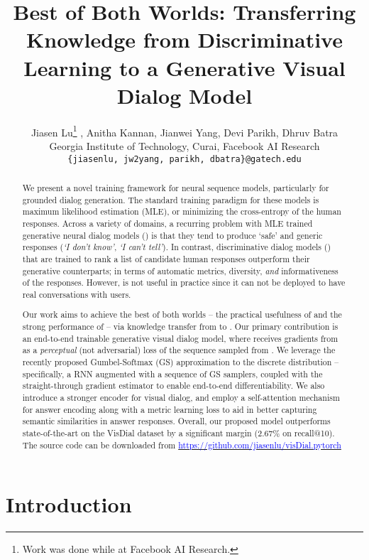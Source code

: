\documentclass{article}
\title{Best of Both Worlds: Transferring Knowledge from Discriminative Learning to a Generative Visual Dialog Model}
\author{
  Jiasen Lu\thanks{Work was done while at Facebook AI Research.}  , Anitha Kannan\footnotemark[1]  , Jianwei Yang, Devi Parikh, Dhruv Batra\\
   Georgia Institute of Technology,  Curai,  Facebook AI Research \\
{\tt\small \{jiasenlu, jw2yang, parikh, dbatra\}@gatech.edu}
}
\newcommand{\myquote}[1]{\emph{`#1'}}
\begin{document}
\maketitle
\begin{abstract}
We present a novel training framework for neural sequence models, particularly for grounded dialog generation. 
The standard training paradigm 
for these models is maximum likelihood estimation (MLE), or minimizing the cross-entropy of the human responses.
Across a variety of domains, a recurring problem with MLE trained generative neural dialog models () is that 
they tend to produce  `safe' and generic responses (\myquote{I don't know}, \myquote{I can't tell}). 
In contrast, discriminative dialog models () that are trained to rank a list of candidate human responses outperform their generative counterparts; 
in terms of automatic metrics, diversity, \emph{and} informativeness of the responses. 
However,  is not useful in practice since it can not be deployed to have real conversations with users. 

Our work aims to achieve the best of both worlds -- the practical usefulness of  and the strong performance of  -- via knowledge transfer from  to .
Our primary contribution is  an end-to-end trainable generative visual dialog model, where  receives gradients from  as a \emph{perceptual} (not adversarial) loss
of the sequence sampled from . 
We leverage the recently proposed Gumbel-Softmax (GS) approximation to the discrete distribution -- 
specifically, a RNN augmented with a sequence of GS samplers, coupled with the straight-through gradient estimator to enable end-to-end differentiability.
We also introduce a stronger encoder for visual dialog, and employ a self-attention mechanism for answer encoding along with a metric learning loss to aid  in better capturing semantic similarities in answer responses. 
Overall, our proposed model outperforms state-of-the-art on the VisDial dataset by a significant margin (2.67\% on recall@10). The source code can be downloaded from \href{url}{\textcolor{blue}{https://github.com/jiasenlu/visDial.pytorch}}

\end{abstract}
\section{Introduction}
\label{sec:intro}
\end{document}
